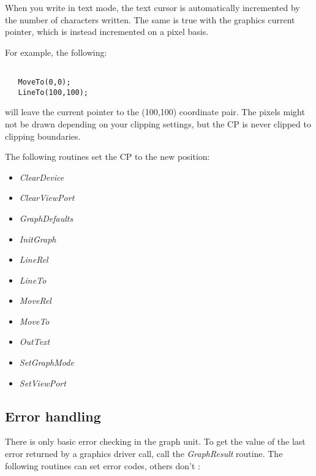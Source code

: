 When you write in text mode, the text cursor is automatically incremented
by the number of characters written. The same is true with the graphics
current pointer, which is instead incremented on a pixel basis.

For example, the following:
\begin{verbatim}

   MoveTo(0,0);
   LineTo(100,100);

\end{verbatim}

will leave the current pointer to the (100,100) coordinate pair. The
pixels might not be drawn depending on your clipping settings, but the
CP is never clipped to clipping boundaries.

The following routines set the CP to the new position:

\begin{itemize}
\item \textit{ClearDevice}
\item \textit{ClearViewPort}
\item \textit{GraphDefaults}
\item \textit{InitGraph}
\item \textit{LineRel}
\item \textit{LineTo}
\item \textit{MoveRel}
\item \textit{MoveTo}
\item \textit{OutText}
\item \textit{SetGraphMode}
\item \textit{SetViewPort}
\end{itemize}

\subsection{Error handling}

There is only basic error checking in the graph unit. To get the value of
the last error returned by a graphics driver call, call the
\textit{GraphResult} routine. The following routines can set error codes,
others don't :

